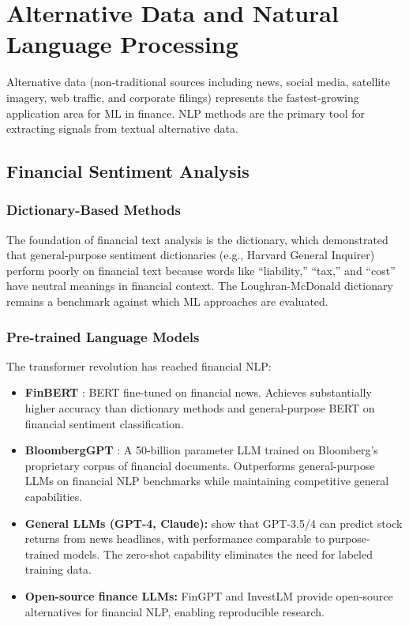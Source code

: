\section{Alternative Data and Natural Language Processing}\label{sec:alternative_data}

Alternative data (non-traditional sources including news, social media, satellite imagery, web traffic, and corporate filings) represents the fastest-growing application area for ML in finance. NLP methods are the primary tool for extracting signals from textual alternative data.

\subsection{Financial Sentiment Analysis}

\subsubsection{Dictionary-Based Methods}

The foundation of financial text analysis is the \citet{Loughran2011} dictionary, which demonstrated that general-purpose sentiment dictionaries (e.g., Harvard General Inquirer) perform poorly on financial text because words like ``liability,'' ``tax,'' and ``cost'' have neutral meanings in financial context. The Loughran-McDonald dictionary remains a benchmark against which ML approaches are evaluated.

\subsubsection{Pre-trained Language Models}

The transformer revolution has reached financial NLP:

\begin{itemize}[leftmargin=*]
    \item \textbf{FinBERT} \citep{Araci2019}: BERT fine-tuned on financial news. Achieves substantially higher accuracy than dictionary methods and general-purpose BERT on financial sentiment classification.

    \item \textbf{BloombergGPT} \citep{Wu2023}: A 50-billion parameter LLM trained on Bloomberg's proprietary corpus of financial documents. Outperforms general-purpose LLMs on financial NLP benchmarks while maintaining competitive general capabilities.

    \item \textbf{General LLMs (GPT-4, Claude):} \citet{LopezLira2023} show that GPT-3.5/4 can predict stock returns from news headlines, with performance comparable to purpose-trained models. The zero-shot capability eliminates the need for labeled training data.

    \item \textbf{Open-source finance LLMs:} FinGPT \citep{Yang2023} and InvestLM provide open-source alternatives for financial NLP, enabling reproducible research.
\end{itemize}

